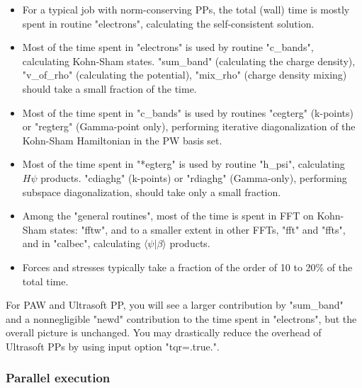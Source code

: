 \documentclass[12pt,a4paper]{article}
\begin{document}
\begin{itemize}
\item
  For a typical job with norm-conserving PPs, the total (wall) time is mostly 
  spent in routine "electrons", calculating the self-consistent solution. 
\item
  Most of the time spent in "electrons" is used by routine "c\_bands", 
  calculating Kohn-Sham states. "sum\_band" (calculating the charge density),
  "v\_of\_rho" (calculating the potential), "mix\_rho" (charge density mixing)
  should take a small fraction of the time.
\item
  Most of the time spent in "c\_bands" is used by routines "cegterg" (k-points)
  or "regterg" (Gamma-point only), performing iterative diagonalization of
  the Kohn-Sham Hamiltonian in the PW basis set. 
\item
  Most of the time spent in "*egterg" is used by routine "h\_psi",
  calculating $H\psi$ products. "cdiaghg" (k-points) or "rdiaghg" (Gamma-only), 
  performing subspace diagonalization, should take only a small fraction.
\item
  Among the "general routines", most of the time is spent in FFT on Kohn-Sham
  states: "fftw", and to a smaller extent in other FFTs, "fft" and "ffts", 
  and in "calbec", calculating $\langle\psi|\beta\rangle$ products. 
\item
  Forces and stresses typically take a fraction of the order of 10 to 20\%
  of the total time.
\end{itemize}
For PAW and Ultrasoft PP, you will see a larger contribution by "sum\_band" 
and a nonnegligible "newd" contribution to the time spent in "electrons", 
but the overall picture is unchanged. You may drastically reduce the
overhead of Ultrasoft PPs by using input option "tqr=.true.".

\subsubsection{Parallel execution}
\end{document}
